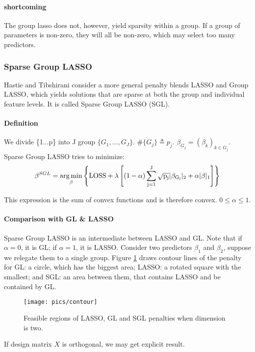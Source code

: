 \documentclass[]{article}
\begin{document}
\paragraph{shortcoming}
The group lasso does not, however, yield sparsity within a group. If a group of parameters is non-zero, they will all be non-zero, which may select too many predictors.
\subsubsection{Sparse Group LASSO}
Hastie and Tibshirani consider a more general penalty blends LASSO and Group LASSO, which yields solutions that are sparse at both the group and individual feature levels. It is called Sparse Group LASSO (SGL).
\paragraph{Definition}
We divide \{1...p\} into J group $ \{G_1,...,G_J\} $. $ \#\{G_j\}\triangleq p_j $. $ \beta_{G_j}=(\beta_k)_{k\in G_j} $.
Sparse Group LASSO tries to minimize:
\begin{equation} 
\beta^{SGL} =\mathop{\arg\min}_{\beta} \left\{\rm LOSS+\lambda \left[(1-\alpha)\sum_{j=1}^J \sqrt{p_j}|\beta_{G_j}|_2
+\alpha |\beta|_1\right]\right\}
\end{equation}

This expression is the sum of convex functions and is therefore convex. $0 \leq \alpha \leq 1$.

\paragraph{Comparison with GL \& LASSO}
Sparse Group LASSO is an intermediate between LASSO and GL. Note that if $ \alpha=0 $, it is GL; if $ \alpha=1 $, it is LASSO. Consider two predictors $ \beta_1 $ and $ \beta_2 $, suppose we relegate them to a single group. Figure \ref{fig:contour} draws contour lines of the penalty for GL: a circle, which has the biggest area; LASSO: a rotated square with the smallest; and SGL: an area between them, that contains LASSO and be contained by GL.
\begin{figure}[H]
	\centering
	\texttt{[image: pics/contour]}
	\caption{Feasible regions of LASSO, GL and SGL penalties when dimension is two.\label{fig:contour}}
	
\end{figure}

If design matrix $X$ is orthogonal, we may get explicit result.
\end{document}
